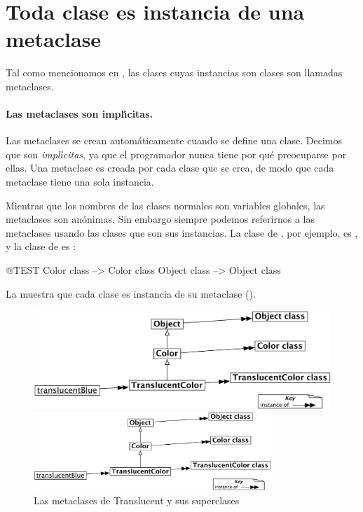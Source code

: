 \documentclass[a4paper,10pt,twoside]{book}
\begin{document}
\section{Toda clase es instancia de una metaclase}


Tal como mencionamos en , las clases cuyas instancias son clases son llamadas {metaclases\xspace}.

\paragraph{Las metaclases son impl\'{\i}citas.}
Las metaclases se crean autom\'aticamente cuando se define una clase. Decimos que son \emph{impl\'{\i}citas}, ya que el programador nunca tiene por qu\'e preocuparse por ellas. Una metaclase  es creada por cada clase que se crea, de modo que cada metaclase tiene una sola instancia.

Mientras que los nombres de las clases normales son variables globales, las metaclases son an\'onimas. Sin embargo siempre podemos referirnos a las metaclases usando las clases que son sus instancias. La clase de , por ejemplo, es , y la clase de  es :
\begin{code}{@TEST}
Color class   --> Color class
Object class --> Object class
\end{code}

\noindent
La  muestra que cada clase es instancia de su metaclase (). 

\begin{center}
\begin{figure}[!ht]
\ifluluelse
	{\centerline {\includegraphics[width=\textwidth]{TranslucentMetaclasses}}}
	{\centerline {\includegraphics[width=0.8\textwidth]{TranslucentMetaclasses}}}
\caption{Las metaclases de Translucent y sus superclases}
\end{figure}
\end{center}
\end{document}
